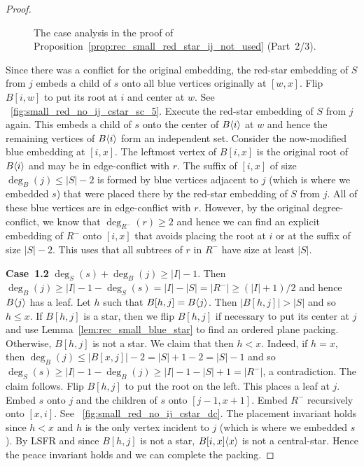 \documentclass[11pt,a4paper,colorlinks=true,urlcolor=blue,citecolor=red]{article}
\theoremstyle{plain}
\newcommand{\case}[1]{\par\vspace{.5\baselineskip}\noindent\textbf{\sffamily Case~#1}}
\begin{document}
\begin{proof}
  \begin{figure}[thbp]
    \centering {}\hfil {}\hfil {}\hfil \caption{The case analysis in the proof of
      Proposition~\ref{prop:rec_small_red_star_ij_not_used} (Part~2/3).}
  \end{figure}

  Since there was a conflict for the original embedding, the
  red-star embedding of $S$ from $j$ embeds a child of $s$ onto
  all blue vertices originally at $[w,x]$. Flip $B[i,w]$ to put its root
  at $i$ and center at $w$. See
  \figurename~\ref{fig:small_red_no_ij_cstar_sc_5}. Execute the
  red-star embedding of $S$ from $j$ again. This embeds a child
  of $s$ onto the center of $B\langle{i}\rangle$ at $w$ and hence the remaining
  vertices of $B\langle{i}\rangle$ form an independent set. Consider the
  now-modified blue embedding at $[i,x]$. The leftmost vertex of
  $B[i,x]$ is the original root of $B\langle{i}\rangle$ and may be in
  edge-conflict with $r$. The suffix of $[i,x]$ of size
  $\deg_B(j)\leq|S|-2$ is formed by blue vertices adjacent to $j$ (which
  is where we embedded $s$) that were placed there by the
  red-star embedding of $S$ from $j$. All of these blue vertices
  are in edge-conflict with $r$. However, by the original
  degree-conflict, we know that $\deg_{R^-}(r)\geq 2$ and hence we can
  find an explicit embedding of $R^-$ onto $[i,x]$ that avoids placing
  the root at $i$ or at the suffix of size $|S|-2$. This uses that all
  subtrees of $r$ in $R^-$ have size at least $|S|$.

  \case{1.2} $\deg_S(s)+\deg_B(j)\geq |I|-1$. Then
  $\deg_B(j)\geq|I|-1-\deg_S(s)=|I|-|S|=|R^-|\geq(|I|+1)/2$ and hence
  $B\langle{j}\rangle$ has a leaf. Let $h$ such that $B[h,j]=B\langle{j}\rangle$. Then
  $|B[h,j]|>|S|$ and so $h\leq x$. If $B[h,j]$ is a star, then we flip
  $B[h,j]$ if necessary to put its center at $j$ and use
  Lemma~\ref{lem:rec_small_blue_star} to find an ordered plane packing.
  Otherwise, $B[h,j]$ is not a star. We claim that then $h<x$. Indeed,
  if $h=x$, then $\deg_B(j)\leq |B[x,j]|-2=|S|+1-2=|S|-1$ and so
  $\deg_S(s)\geq|I|-1-\deg_B(j)\geq|I|-1-|S|+1=|R^-|$, a contradiction.
  The claim follows. Flip $B[h,j]$ to put the root on the left. This
  places a leaf at $j$. Embed $s$ onto $j$ and the children of $s$ onto
  $[j-1,x+1]$. Embed $R^-$ recursively onto $[x,i]$. See
  \figurename~\ref{fig:small_red_no_ij_cstar_dc}. The placement
  invariant holds since $h<x$ and $h$ is the only vertex incident to $j$
  (which is where we embedded $s$).  By LSFR and since $B[h,j]$ is not a
  star, $B{[i,x]}\langle{x}\rangle$ is not a central-star. Hence the peace
  invariant holds and we can complete the packing.


\end{proof}
\end{document}
